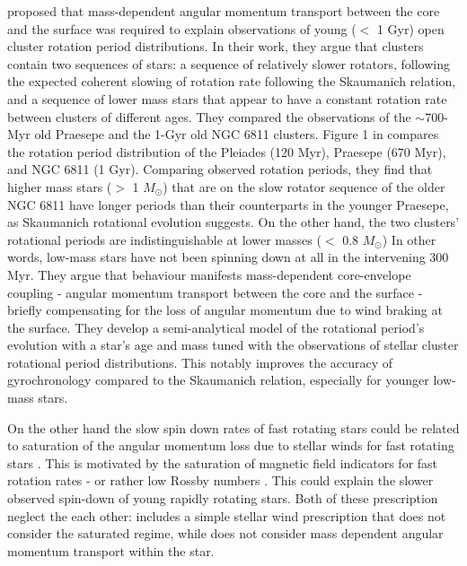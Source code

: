 \citet{spada_competing_2020} proposed that mass-dependent angular momentum transport between the core and the surface was required to explain observations of young ($<$ 1 Gyr) open cluster rotation period distributions.
In their work, they argue that clusters contain two sequences of stars: a sequence of relatively slower rotators, following the expected coherent slowing of rotation rate following the Skaumanich relation, and a sequence of lower mass stars that appear to have a constant rotation rate between clusters of different ages.
They compared the observations of the $\sim$700-Myr old Praesepe and the 1-Gyr old NGC 6811 clusters.
Figure 1 in \citet{spada_competing_2020} compares the rotation period distribution of the Pleiades (120 Myr), Praesepe (670 Myr), and NGC 6811 (1 Gyr).
Comparing observed rotation periods, they find that higher mass stars ($>$ 1 $M_{\odot}$) that are on the slow rotator sequence of the older NGC 6811 have longer periods than their counterparts in the younger Praesepe, as Skaumanich rotational evolution suggests.
On the other hand, the two clusters' rotational periods are indistinguishable at lower masses ($<$ 0.8 $M_{\odot}$)
In other words, low-mass stars have not been spinning down at all in the intervening 300 Myr. 
They argue that behaviour manifests mass-dependent core-envelope coupling - angular momentum transport between the core and the surface - briefly compensating for the loss of angular momentum due to wind braking at the surface.
They develop a semi-analytical model of the rotational period's evolution with a star's age and mass tuned with the observations of stellar cluster rotational period distributions.
This notably improves the accuracy of gyrochronology compared to the Skaumanich relation, especially for younger low-mass stars.

On the other hand the slow spin down rates of fast rotating stars could be related to saturation of the angular momentum loss due to stellar winds for fast rotating stars \citep{johnstone_stellar_2015, johnstone_stellar_2015-1,gallet_improved_2013}.
This is motivated by the saturation of magnetic field indicators for fast rotation rates - or rather low Rossby numbers \citep{wright_stellar-activity-rotation_2011}.
This could explain the slower observed spin-down of young rapidly rotating stars.
Both of these prescription neglect the each other: \citep{spada_competing_2020} includes a simple stellar wind prescription that does not consider the saturated regime, while \citep{gallet_improved_2013} does not consider mass dependent angular momentum transport within the star.

